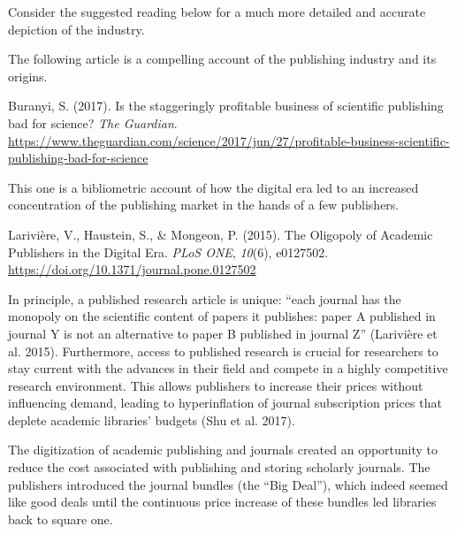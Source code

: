 \documentclass[
  letterpaper,
  DIV=11,
  numbers=noendperiod]{scrreprt}
\begin{document}
Consider the suggested reading below for a much more detailed and
accurate depiction of the industry.

\begin{tcolorbox}[enhanced jigsaw, arc=.35mm, bottomrule=.15mm, bottomtitle=1mm, breakable, colback=white, colbacktitle=quarto-callout-note-color!10!white, colframe=quarto-callout-note-color-frame, coltitle=black, left=2mm, leftrule=.75mm, opacityback=0, opacitybacktitle=0.6, rightrule=.15mm, title=\textcolor{quarto-callout-note-color}{\faInfo}\hspace{0.5em}{Suggested readings}, titlerule=0mm, toprule=.15mm, toptitle=1mm]

The following article is a compelling account of the publishing industry
and its origins.

Buranyi, S. (2017). Is the staggeringly profitable business of
scientific publishing bad for science? \emph{The Guardian}.
\url{https://www.theguardian.com/science/2017/jun/27/profitable-business-scientific-publishing-bad-for-science}

This one is a bibliometric account of how the digital era led to an
increased concentration of the publishing market in the hands of a few
publishers.

Larivière, V., Haustein, S., \& Mongeon, P. (2015). The Oligopoly of
Academic Publishers in the Digital Era. \emph{PLoS ONE}, \emph{10}(6),
e0127502. \url{https://doi.org/10.1371/journal.pone.0127502}

\end{tcolorbox}

In principle, a published research article is unique: ``each journal has
the monopoly on the scientific content of papers it publishes: paper A
published in journal Y is not an alternative to paper B published in
journal Z'' (Larivière et al. 2015). Furthermore, access to published
research is crucial for researchers to stay current with the advances in
their field and compete in a highly competitive research environment.
This allows publishers to increase their prices without influencing
demand, leading to hyperinflation of journal subscription prices that
deplete academic libraries' budgets (Shu et al. 2017).

The digitization of academic publishing and journals created an
opportunity to reduce the cost associated with publishing and storing
scholarly journals. The publishers introduced the journal bundles (the
``Big Deal''), which indeed seemed like good deals until the continuous
price increase of these bundles led libraries back to square one.
\end{document}
